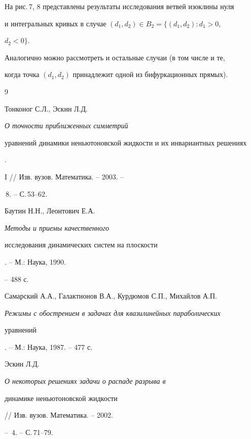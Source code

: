  


На рис.\,7, 8 представлены результаты исследования ветвей изоклины нуля 


и интегральных кривых в случае $(d_1,d_2)\in B_2=\{(d_1,d_2):d_1>0$, 


$d_2<0\}$. 


 


Аналогично можно рассмотреть и остальные случаи (в том числе и те, 


когда точка $(d_1,d_2)$ принадлежит одной из бифуркационных прямых). 


 


 


\begin{thebibliography}{9} 


 




Тонконог С.Л., Эскин Л.Д. {\em О точности приближенных симметрий 


уравнений динамики неньютоновской жидкости и их инвариантных решениях}. 


I // Изв. вузов. Математика. -- 2003. -- 


\No\,8. -- С.\,53--62. 




Баутин Н.Н., Леонтович Е.А. {\em Методы и приемы качественного 


исследования динамических систем на плоскости}. -- М.: Наука, 1990. 


-- 488 с. 




Самарский А.А., Галактионов В.А., Курдюмов С.П., Михайлов А.П. 


{\em Режимы с обострением в задачах для квазилинейных параболических 


уравнений}. -- М.: Наука, 1987. -- 477 с. 




Эскин Л.Д. {\em О некоторых решениях задачи о распаде разрыва в 


динамике неньютоновской жидкости} // Изв. вузов. Математика. -- 2002. 


-- \No\,4. -- С.\,71--79. 


 


 


\end{thebibliography} 


 


\vskip 2cm 


 




 \tts{!!!!!} 




 


\label{end} 


 


